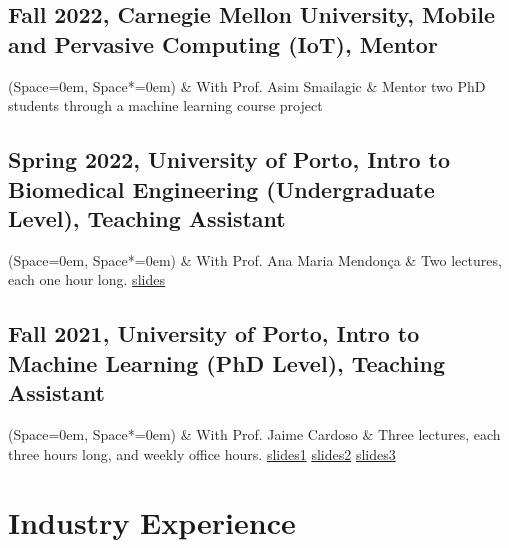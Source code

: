 \documentclass[10pt,letterpaper,pdf]{article}
\begin{document}
\subsection{\small Fall 2022, Carnegie Mellon University, Mobile and Pervasive Computing (IoT), Mentor}
\begin{easylist} \ListProperties(Space=0em, Space*=0em)
    & With Prof. Asim Smailagic
    & Mentor two PhD students through a machine learning course project
\end{easylist}

\subsection{\small Spring 2022, University of Porto, Intro to Biomedical Engineering (Undergraduate
Level), Teaching Assistant}
\begin{easylist} \ListProperties(Space=0em, Space*=0em)
    & With Prof. Ana Maria Mendon{\c{c}}a
    & Two lectures, each one hour long.  \href{https://docs.google.com/presentation/d/1lco5nlckinGk8RVHosJapeGzfjR6MUC9TbwOuRjUSms/edit?usp=sharing}{slides}
\end{easylist}

\subsection{\small Fall 2021, University of Porto, Intro to Machine Learning (PhD Level), Teaching Assistant}
\begin{easylist} \ListProperties(Space=0em, Space*=0em)
    & With Prof. Jaime Cardoso
    & Three lectures, each three hours long, and weekly office hours. \href{https://docs.google.com/presentation/d/1joBU3QM3jcpMYBDeFdvwiuDHdXrLZweiAiW1BgXMN7E/edit?usp=sharing}{slides1} \href{https://docs.google.com/presentation/d/1OkectcY5ImaDDD-a2M4ZRNoKgxxkM5DyoJ3oRK_vKn8/edit?usp=sharing}{slides2} \href{https://docs.google.com/presentation/d/14uhYMDF_xdyQosnJnFvr8sqUh31SGAtaN7V4Ob6f13Q/edit?usp=sharing}{slides3}
\end{easylist}


\section{Industry Experience}
\end{document}
